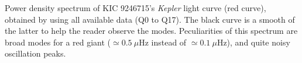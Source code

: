 \label{fig:seismo} Power density spectrum of KIC 9246715's \textit{Kepler} light curve (red curve), obtained by using all available data (Q0 to Q17). The black curve is a smooth of the latter to help the reader observe the modes. Peculiarities of this spectrum are broad modes for a red giant ($\simeq0.5\ \mu$Hz instead of $\simeq0.1\ \mu$Hz), and quite noisy oscillation peaks. 
  
  
  